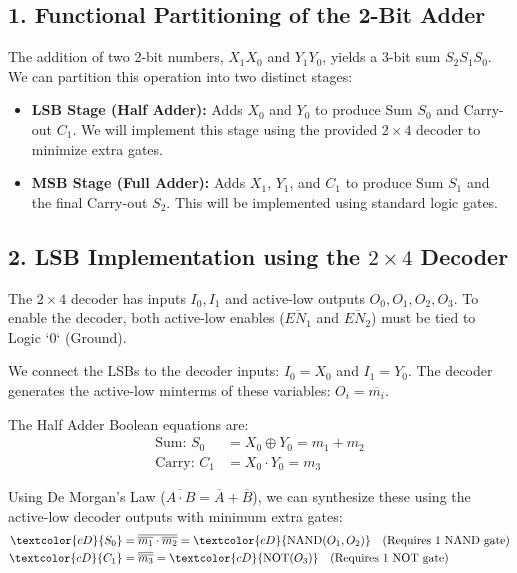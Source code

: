 \documentclass[12pt,a3paper]{article}
\begin{document}
\begin{enumerate}
\begin{tcolorbox}[enhanced,breakable,ansbox,colback=cD!4,colframe=cD,boxrule=0.8pt,arc=5pt,title={\textbf{Answer}},fonttitle=\bfseries\color{white},colbacktitle=cD]
\subsection*{1. Functional Partitioning of the 2-Bit Adder}
The addition of two 2-bit numbers, $X_1 X_0$ and $Y_1 Y_0$, yields a 3-bit sum $S_2 S_1 S_0$. We can partition this operation into two distinct stages:
\begin{itemize}
    \item \textbf{LSB Stage (Half Adder):} Adds $X_0$ and $Y_0$ to produce Sum $S_0$ and Carry-out $C_1$. We will implement this stage using the provided $2 \times 4$ decoder to minimize extra gates.
    \item \textbf{MSB Stage (Full Adder):} Adds $X_1$, $Y_1$, and $C_1$ to produce Sum $S_1$ and the final Carry-out $S_2$. This will be implemented using standard logic gates.
\end{itemize}

\subsection*{2. LSB Implementation using the $2 \times 4$ Decoder}
The $2 \times 4$ decoder has inputs $I_0, I_1$ and active-low outputs $O_0, O_1, O_2, O_3$. To enable the decoder, both active-low enables ($\overline{EN_1}$ and $\overline{EN_2}$) must be tied to Logic `0` (Ground). 

We connect the LSBs to the decoder inputs: $I_0 = X_0$ and $I_1 = Y_0$. The decoder generates the active-low minterms of these variables: $O_i = \overline{m_i}$.

The Half Adder Boolean equations are:
\begin{align*}
    \text{Sum: } S_0 &= X_0 \oplus Y_0 = m_1 + m_2 \\
    \text{Carry: } C_1 &= X_0 \cdot Y_0 = m_3
\end{align*}

Using De Morgan's Law ($\overline{A \cdot B} = \overline{A} + \overline{B}$), we can synthesize these using the active-low decoder outputs with minimum extra gates:
\begin{align*}
    \textcolor{cD}{S_0} &= \overline{\overline{m_1} \cdot \overline{m_2}} = \textcolor{cD}{\text{NAND}(O_1, O_2)} \quad \text{(Requires 1 NAND gate)} \\
    \textcolor{cD}{C_1} &= \overline{\overline{m_3}} = \textcolor{cD}{\text{NOT}(O_3)} \quad \text{(Requires 1 NOT gate)}
\end{align*}


\end{tcolorbox}
\end{enumerate}
\end{document}

